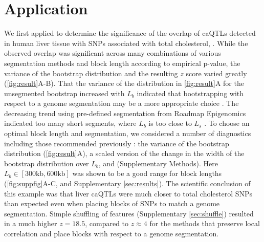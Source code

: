 \vspace*{-20pt}
\section{Application}

We first applied \bootranges to determine the significance of the
overlap of caQTLs detected in human liver tissue
\citep{CURRIN20211169} with SNPs associated with total cholesterol,
.
While the observed overlap was significant across many combinations of
various segmentation methods and block length according to empirical p-value, 
the variance of the
bootstrap distribution and the resulting $z$ score varied greatly
(\cref{fig:result}A-B).  
That the variance of the distribution in \cref{fig:result}A for the
unsegmented bootstrap increased with $L_b$ indicated that
bootstrapping with respect to a genome
segmentation may be a more appropriate choice
\citep{bickel2010subsampling}. 
The decreasing trend using pre-defined segmentation from
Roadmap Epigenomics indicated too many short segments,
where $L_b$ is too close to $L_s$ .
To choose an optimal block length and segmentation, 
we considered a number of diagnostics including
those recommended previously \citep{bickel2010subsampling}:
the variance of the bootstrap distribution (\cref{fig:result}A),
a scaled version of the change in the width of the 
bootstrap distribution over $L_b$,
and  (Supplementary Methods).
Here $L_b \in [300\textrm{kb},600\textrm{kb}]$ was shown to be a good range for block
lengths (\cref{fig:suppfig}A-C, and Supplementary \cref{sec:results}).
The scientific conclusion of this example was that liver caQTLs were
much closer to total cholesterol SNPs than expected even when placing
blocks of SNPs to match a genome segmentation.
Simple shuffling of features (Supplementary \cref{sec:shuffle})
resulted in a much higher $z = 18.5$, compared to $z \approx 4$ for
the methods that preserve local correlation and place blocks with
respect to a genome segmentation.

